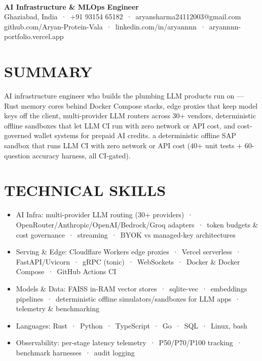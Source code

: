 \documentclass[9pt]{article}
\begin{document}
\\[3pt]
{\large\bfseries AI Infrastructure \& MLOps Engineer}\\[3pt]
{\small\color{greyc} Ghaziabad, India \,·\, +91 93154 65182 \,·\, aryansharma24112003@gmail.com}\vspace{-2pt}
{\small\color{greyc} github.com/Aryan-Protein-Vala \,·\, linkedin.com/in/aryannnn \,·\, aryannnn-portfolio.vercel.app}\vspace{-2pt}
\section*{SUMMARY}
AI infrastructure engineer who builds the plumbing LLM products run on  ---  Rust memory cores behind Docker Compose stacks, edge proxies that keep model keys off the client, multi-provider LLM routers across 30+ vendors, deterministic offline sandboxes that let LLM CI run with zero network or API cost, and cost-governed wallet systems for prepaid AI credits. a deterministic offline SAP sandbox that runs LLM CI with zero network or API cost (40+ unit tests + 60-question accuracy harness, all CI-gated).
\vspace{1pt}
\section*{TECHNICAL SKILLS}
\begin{itemize}[leftmargin=11pt,itemsep=0pt,topsep=1pt,parsep=0pt]
\item AI Infra: multi-provider LLM routing (30+ providers) \,·\, OpenRouter/Anthropic/OpenAI/Bedrock/Groq adapters \,·\, token budgets \& cost governance \,·\, streaming \,·\, BYOK vs managed-key architectures
\item Serving \& Edge: Cloudflare Workers edge proxies \,·\, Vercel serverless \,·\, FastAPI/Uvicorn \,·\, gRPC (tonic) \,·\, WebSockets \,·\, Docker \& Docker Compose \,·\, GitHub Actions CI
\item Models \& Data: FAISS in-RAM vector stores \,·\, sqlite-vec \,·\, embeddings pipelines \,·\, deterministic offline simulators/sandboxes for LLM apps \,·\, telemetry \& benchmarking
\item Languages: Rust \,·\, Python \,·\, TypeScript \,·\, Go \,·\, SQL \,·\, Linux, bash
\item Observability: per-stage latency telemetry \,·\, P50/P70/P100 tracking \,·\, benchmark harnesses \,·\, audit logging
\end{itemize}
\end{document}

